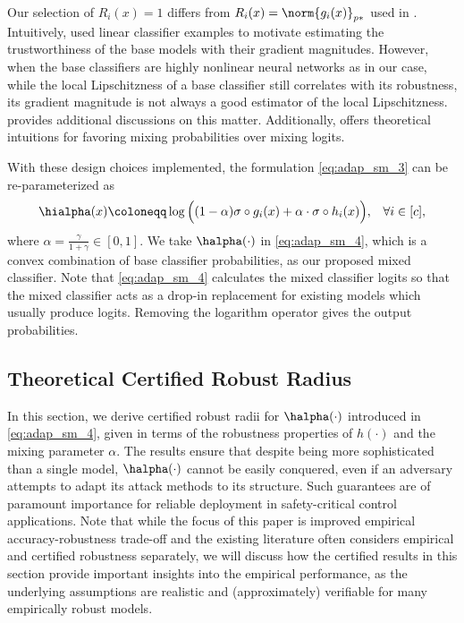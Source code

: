 \documentclass[11pt, letterpaper]{article}
\theoremstyle{plain}
\theoremstyle{definition}
\begin{document}
Our selection of $R_i (x) = 1$ differs from $R_i (x) = \norm{g_i (x)}_{p*}$ used in \citep{Anderson21b}. Intuitively, \citep{Anderson21b} used linear classifier examples to motivate estimating the trustworthiness of the base models with their gradient magnitudes. However, when the base classifiers are highly nonlinear neural networks as in our case, while the local Lipschitzness of a base classifier still correlates with its robustness, its gradient magnitude is not always a good estimator of the local Lipschitzness.  provides additional discussions on this matter. Additionally,  offers theoretical intuitions for favoring mixing probabilities over mixing logits.

With these design choices implemented, the formulation \cref{eq:adap_sm_3} can be re-parameterized as
\begin{gather} \label{eq:adap_sm_4}
    \hialpha (x) \coloneqq \log \Big( (1 - \alpha) \sigma \circ g_i(x) + \alpha \cdot \sigma \circ h_i(x) \Big), \;\;\; \forall i \in [c],
\end{gather}
where $\alpha = \frac{\gamma} {1 + \gamma} \in [0, 1]$. We take $\halpha (\cdot)$ in \cref{eq:adap_sm_4}, which is a convex combination of base classifier probabilities, as our proposed mixed classifier. Note that \cref{eq:adap_sm_4} calculates the mixed classifier logits so that the mixed classifier acts as a drop-in replacement for existing models which usually produce logits. Removing the logarithm operator gives the output probabilities.


\subsection{Theoretical Certified Robust Radius} \label{sec:certified_radius_thms}

In this section, we derive certified robust radii for $\halpha (\cdot)$ introduced in \cref{eq:adap_sm_4}, given in terms of the robustness properties of $h (\cdot)$ and the mixing parameter $\alpha$. The results ensure that despite being more sophisticated than a single model, $\halpha (\cdot)$ cannot be easily conquered, even if an adversary attempts to adapt its attack methods to its structure. Such guarantees are of paramount importance for reliable deployment in safety-critical control applications. Note that while the focus of this paper is improved empirical accuracy-robustness trade-off and the existing literature often considers empirical and certified robustness separately, we will discuss how the certified results in this section provide important insights into the empirical performance, as the underlying assumptions are realistic and (approximately) verifiable for many empirically robust models.
\end{document}
